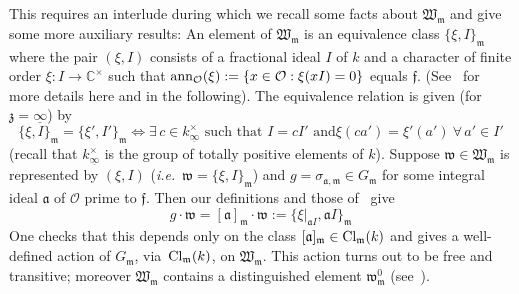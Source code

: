\documentclass[12pt]{article}
\newcounter{rem}[section]%
\newcommand{\bbC}{\ensuremath{\mathbb{C}}}
\newcommand{\beql}[1]{\begin{equation}\label{#1}}
\newcommand{\Cl}{{\rm Cl}}
\newcommand{\cO}{\ensuremath{\mathcal{O}}}
\newcommand{\eeq}{\end{equation}}
\newcommand{\fa}{\ensuremath{\mathfrak{a}}}
\newcommand{\ff}{\ensuremath{\mathfrak{f}}}
\newcommand{\fm}{\ensuremath{\mathfrak{m}}}
\newcommand{\fw}{\ensuremath{\mathfrak{w}}}
\newcommand{\fW}{\ensuremath{\mathfrak{W}}}
\newcommand{\fz}{\ensuremath{\mathfrak{z}}}
\newcommand{\ie}{\emph{i.e.}}
\newcommand{\rem}{\refstepcounter{rem}\noindent{\sc Remark \therem}}%
\renewcommand{\therem}{\thesection.\arabic{rem}}
\newcommand{\Clmk}{\ensuremath{\Cl_\fm(k)}}
\newcommand{\uinf}{\ensuremath{{\underline{\infty}}}}
\begin{document}
This requires an interlude during which we recall some facts about $\fW_\fm$
and give some more auxiliary results:
An element of $\fW_\fm$ is an equivalence class
$\{\xi,I\}_\fm$ where the pair $(\xi,I)$ consists of a fractional
ideal $I$ of $k$ and a character of finite order $\xi:I\rightarrow\bbC^\times$
such that ${\rm ann}_\cO(\xi):=\{x\in\cO:\xi(xI)=0\}$ equals $\ff$.
(See~\cite{twizas} for more details here and in the following).
The equivalence relation is given (for $\fz=\uinf$) by
\beql{eq:3M.5}
\mbox{
$\{\xi,I\}_\fm=\{\xi',I'\}_\fm\Longleftrightarrow
\exists\, c\in k^\times_{\uinf}$ such that $I=cI'$ and
$\xi(ca')=\xi'(a')\ \forall\,a'\in I'$}
\eeq
(recall that $k^\times_{\uinf}$ is the group of totally positive
elements of $k$).
Suppose $\fw\in \fW_\fm$ is represented by  $(\xi,I)$
(\ie\ $\fw=\{\xi,I\}_\fm$) and $g=\sigma_{\fa,\fm}\in G_\fm$
for some integral ideal $\fa$ of $\cO$ prime to $\ff$. Then our definitions
and those of~\cite{twizas} give
\[
g\cdot\fw=[\fa]_\fm\cdot\fw:=\{\xi|_{\fa I},\fa I\}_\fm
\]
One checks that this depends only on the class $[\fa]_\fm\in\Cl_\fm(k)$
and gives a well-defined action
of $G_\fm$, via~$\Clmk$, on $\fW_\fm$. This action turns out to be free
and transitive; moreover $\fW_\fm$ contains a distinguished element $\fw_\fm^0$
(see~\cite{twizas}).
\end{document}

